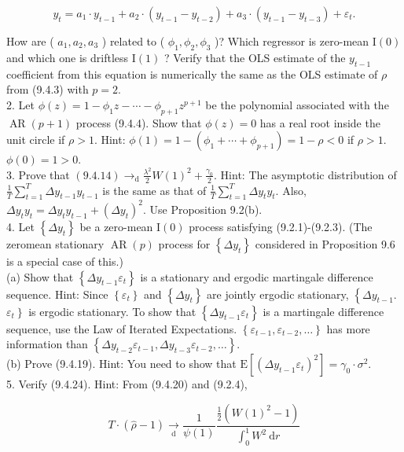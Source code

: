 \documentclass[10pt]{article}
\begin{document}
$$
y_{t}=a_{1} \cdot y_{t-1}+a_{2} \cdot\left(y_{t-1}-y_{t-2}\right)+a_{3} \cdot\left(y_{t-1}-y_{t-3}\right)+\varepsilon_{t} .
$$

How are ( $a_{1}, a_{2}, a_{3}$ ) related to ( $\phi_{1}, \phi_{2}, \phi_{3}$ )? Which regressor is zero-mean $\mathrm{I}(0)$ and which one is driftless $\mathrm{I}(1)$ ? Verify that the OLS estimate of the $y_{t-1}$ coefficient from this equation is numerically the same as the OLS estimate of $\rho$ from (9.4.3) with $p=2$.\\
2. Let $\phi(z)=1-\phi_{1} z-\cdots-\phi_{p+1} z^{p+1}$ be the polynomial associated with the $\operatorname{AR}(p+1)$ process (9.4.4). Show that $\phi(z)=0$ has a real root inside the unit circle if $\rho>1$. Hint: $\phi(1)=1-\left(\phi_{1}+\cdots+\phi_{p+1}\right)=1-\rho<0$ if $\rho>1$. $\phi(0)=1>0$.\\
3. Prove that $(9.4 .14) \rightarrow_{\mathrm{d}} \frac{\lambda^{2}}{2} W(1)^{2}+\frac{\gamma_{0}}{2}$. Hint: The asymptotic distribution of $\frac{1}{T} \sum_{t=1}^{T} \Delta y_{t-1} y_{t-1}$ is the same as that of $\frac{1}{T} \sum_{t=1}^{T} \Delta y_{t} y_{t}$. Also, $\Delta y_{t} y_{t}= \Delta y_{t} y_{t-1}+\left(\Delta y_{t}\right)^{2}$. Use Proposition 9.2(b).\\
4. Let $\left\{\Delta y_{t}\right\}$ be a zero-mean $\mathrm{I}(0)$ process satisfying (9.2.1)-(9.2.3). (The zeromean stationary $\operatorname{AR}(p)$ process for $\left\{\Delta y_{t}\right\}$ considered in Proposition 9.6 is a special case of this.)\\
(a) Show that $\left\{\Delta y_{t-1} \varepsilon_{t}\right\}$ is a stationary and ergodic martingale difference sequence. Hint: Since $\left\{\varepsilon_{t}\right\}$ and $\left\{\Delta y_{t}\right\}$ are jointly ergodic stationary, $\left\{\Delta y_{t-1}\right.$. $\left.\varepsilon_{t}\right\}$ is ergodic stationary. To show that $\left\{\Delta y_{t-1} \varepsilon_{t}\right\}$ is a martingale difference sequence, use the Law of Iterated Expectations. $\left\{\varepsilon_{t-1}, \varepsilon_{t-2}, \ldots\right\}$ has more information than $\left\{\Delta y_{t-2} \varepsilon_{t-1}, \Delta y_{t-3} \varepsilon_{t-2}, \ldots\right\}$.\\
(b) Prove (9.4.19). Hint: You need to show that $\mathrm{E}\left[\left(\Delta y_{t-1} \varepsilon_{t}\right)^{2}\right]=\gamma_{0} \cdot \sigma^{2}$.\\
5. Verify (9.4.24). Hint: From (9.4.20) and (9.2.4),

$$
T \cdot(\hat{\rho}-1) \underset{\mathrm{d}}{\rightarrow} \frac{1}{\psi(1)} \frac{\frac{1}{2}\left(W(1)^{2}-1\right)}{\int_{0}^{1} W^{2} \mathrm{~d} r}
$$
\end{document}
